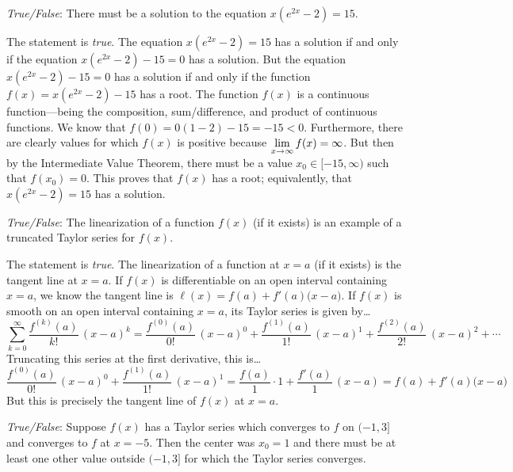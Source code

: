 \documentclass[11pt,letterpaper]{article}
\begin{document}
\thispagestyle{title}

\quizsol \textit{True/False}: There must be a solution to the equation $x \left( e^{2x} - 2 \right)= 15$.  \pspace

\sol The statement is \textit{true}. The equation $x \left( e^{2x} - 2 \right)= 15$ has a solution if and only if the equation $x \left( e^{2x} - 2 \right) - 15= 0$ has a solution. But the equation $x \left( e^{2x} - 2 \right) - 15= 0$ has a solution if and only if the function $f(x)= x \left( e^{2x} - 2 \right) - 15$ has a root. The function $f(x)$ is a continuous function---being the composition, sum/difference, and product of continuous functions. We know that $f(0)= 0 (1 - 2) - 15= -15 < 0$. Furthermore, there are clearly values for which $f(x)$ is positive because $\displaystyle \lim_{x \to \infty} f(x)= \infty$. But then by the Intermediate Value Theorem, there must be a value $x_0 \in [-15, \infty)$ such that $f(x_0)= 0$. This proves that $f(x)$ has a root; equivalently, that $x \left( e^{2x} - 2 \right)= 15$ has a solution. \pvspace{1.3cm}



\quizsol \textit{True/False}: The linearization of a function $f(x)$ (if it exists) is an example of a truncated Taylor series for $f(x)$. \pspace

\sol The statement is \textit{true}. The linearization of a function at $x= a$ (if it exists) is the tangent line at $x= a$. If $f(x)$ is differentiable on an open interval containing $x= a$, we know the tangent line is $\ell(x)= f(a) + f'(a) \big(x - a \big)$. If $f(x)$ is smooth on an open interval containing $x= a$, its Taylor series is given by\dots
	\[
	\sum_{k=0}^\infty \dfrac{f^{(k)}(a)}{k!} \, (x - a)^k= \dfrac{f^{(0)}(a)}{0!} \, (x - a)^0 + \dfrac{f^{(1)}(a)}{1!} \, (x - a)^1 + \dfrac{f^{(2)}(a)}{2!} \, (x - a)^2 + \cdots
	\]
Truncating this series at the first derivative, this is\dots
	\[
	\dfrac{f^{(0)}(a)}{0!} \, (x - a)^0 + \dfrac{f^{(1)}(a)}{1!} \, (x - a)^1= \dfrac{f(a)}{1} \cdot 1 + \dfrac{f'(a)}{1} \, (x - a)= f(a) + f'(a) \big(x - a \big)
	\]
But this is precisely the tangent line of $f(x)$ at $x= a$. \pvspace{1.3cm}



\quizsol \textit{True/False}: Suppose $f(x)$ has a Taylor series which converges to $f$ on $(-1, 3]$ and converges to $f$ at $x= -5$. Then the center was $x_0= 1$ and there must be at least one other value outside $(-1, 3]$ for which the Taylor series converges. \pspace
\end{document}
